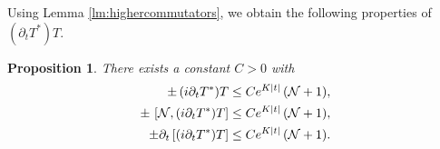 \documentclass[11pt,a4paper]{article}
\newtheorem{proposition}[thm]{Proposition}
\newcommand{\ech}[2]{#2}	%
\newcommand{\ekt}{e^{K\lvert t\rvert}}	%
\newcommand{\cN}{{\cal N}}
\begin{document}
Using Lemma \ref{lm:highercommutators}, we obtain the following properties of $(\partial_t T^*)T$.
\begin{proposition}\label{prp:dTT}
There exists a constant $C>0$ with 
\begin{equation}\begin{split}
\label{eq:prT-cl1}  \pm \, (i\partial_t T^*) T &\leq C \ech{\|
\varphi_t^{(N)} \|_{H^2}}{\ekt} \,  (\cN +1), \\
\pm \, \left[ \cN , (i\partial_t T^*) T \right]  &\leq C \ech{\|
\varphi_t^{(N)} \|_{H^2}}{\ekt} \, (\cN + 1), \\
\pm \partial_t \left[ (i\partial_t T^*) T \right] &\leq C \ech{(\| \varphi_t^{(N)} \|^2_{H^2} + \| \varphi_t^{(N)} \|_{H^4})}{\ekt} \, (\cN +1). 
\end{split}
\end{equation}
\end{proposition}
\end{document}
